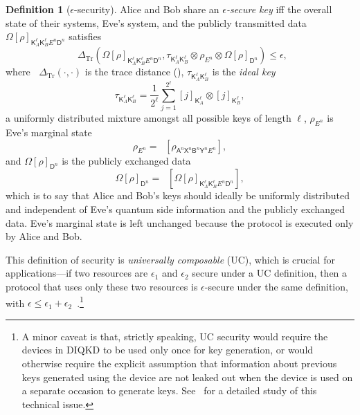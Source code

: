 \documentclass[10pt, a4paper]{article}
\numberwithin{equation}{section} %
\newcounter{stmt} %
\theoremstyle{definition}
\newtheorem{defn}[stmt]{Definition}
\theoremstyle{plain}
\newcommand{\?}{\mathrel{?}} %
\newcommand{\Tr}[2][]{\mathop{\mathrm{Tr}#1}\left[ #2 \right]} %
\newcommand{\Trdist}[2]{\mathop{}\Delta_\mathrm{Tr}\left(#1, #2\right)}
\newcommand{\crv}[1]{\mathsf{#1}}
\newcommand{\proj}[2][]{{[#2]}_{#1}}
\begin{document}
    \begin{defn}[\(\epsilon\)-security]
    Alice and Bob share an \emph{\(\epsilon\)-secure key} iff the overall state of their systems, Eve's system, and the publicly transmitted data \({\Omega[\rho]}_{\crv{K}_{A}^{\ell} \crv{K}_{B}^{\ell} E^n \crv{D}^n}\) satisfies
      \begin{equation}
        \Trdist{{\Omega[\rho]}_{\crv{K}_{A}^{\ell} \crv{K}_{B}^{\ell} E^n \crv{D}^n}}{\tau_{\crv{K}_{A}^{\ell} \crv{K}_{B}^{\ell}} \otimes \rho_{E^n} \otimes {\Omega[\rho]}_{\crv{D}^n}} \leq \epsilon,
      \end{equation}
      where \(\Trdist{\cdot}{\cdot}\) is the trace distance (), \(\tau_{\crv{K}_{A}^{\ell} \crv{K}_{B}^{\ell}}\) is the \emph{ideal key}
      \begin{equation}
        \tau_{\crv{K}_{A}^{\ell} \crv{K}_{B}^{\ell}} = \frac{1}{2^{\ell}} \sum_{j=1}^{2^{\ell}} \proj[\crv{K}_{A}^{\ell}]{j} \otimes \proj[\crv{K}_{B}^{\ell}]{j},
      \end{equation}
      a uniformly distributed mixture amongst all possible keys of length \(\ell\), \(\rho_{E^n}\) is Eve's marginal state
      \begin{equation}
        \rho_{E^n} = \Tr[_{\crv{A}^n\crv{X}^n \crv{B}^n\crv{Y}^n}]{ \rho_{\crv{A}^n\crv{X}^n \crv{B}^n\crv{Y}^n E^n} },
      \end{equation}
      and \({\Omega[\rho]}_{\crv{D}^n}\) is the publicly exchanged data
      \begin{equation}
        {\Omega[\rho]}_{\crv{D}^n} = \Tr[_{\crv{K}_{A}^{\ell} \crv{K}_{B}^{\ell} E^n}]{ {\Omega[\rho]}_{\crv{K}_{A}^{\ell} \crv{K}_{B}^{\ell} E^n \crv{D}^n} },
      \end{equation} 
      which is to say that Alice and Bob's keys should ideally be uniformly distributed and independent of Eve's quantum side information and the publicly exchanged data. Eve's marginal state is left unchanged because the protocol is executed only by Alice and Bob.
    \end{defn}

    This definition of security is \emph{universally composable} (UC), which is crucial for applications---if two resources are \(\epsilon_1\) and \(\epsilon_2\) secure under a UC definition, then a protocol that uses only these two resources is \(\epsilon\)-secure under the same definition, with \(\epsilon \leq \epsilon_1 + \epsilon_2\)~\cite{SecurityQKD}.\footnote{A minor caveat is that, strictly speaking, UC security would require the devices in DIQKD to be used only once for key generation, or would otherwise require the explicit assumption that information about previous keys generated using the device are not leaked out when the device is used on a separate occasion to generate keys. See~\cite{SecurityQKD} for a detailed study of this technical issue.}
\end{document}
